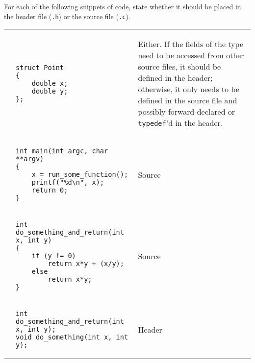 For each of the following snippets of code, state whether it should be placed in the header file (\texttt{.h}) or the source file (\texttt{.c}).

\begin{enumerate}

\begin{tabular}{p{.25in}p{1.5in} p{4.5in}}
\item
&
{
\begin{lstlisting}[numbers=none]
struct Point
{
	double x;
	double y;
};
\end{lstlisting}
}
&
\begin{answer}
Either. If the fields of the type need to be accessed from other source files, it should be defined in the header; otherwise, it only needs to be defined in the source file and possibly forward-declared or \texttt{typedef}'d in the header.
\end{answer}
\\
\item
&
{
\begin{lstlisting}[numbers=none]
int main(int argc, char **argv)
{
	x = run_some_function();
	printf("%d\n", x);
	return 0;
}
\end{lstlisting}
}
&
\begin{answer}
\hspace{2.5in}
Source
\end{answer}
\\
\item
&
{
\begin{lstlisting}[numbers=none]
int do_something_and_return(int x, int y)
{
	if (y != 0)
		return x*y + (x/y);
	else
		return x*y;
}
\end{lstlisting}
}
&
\begin{answer}
\hspace{2.5in}
Source
\end{answer}
\\
\item
&
{
\begin{lstlisting}[numbers=none]
int do_something_and_return(int x, int y);
void do_something(int x, int y);
\end{lstlisting}
}
&
\begin{answer}
\hspace{2.5in}
Header
\end{answer}
\\
\end{tabular}
\end{enumerate}

